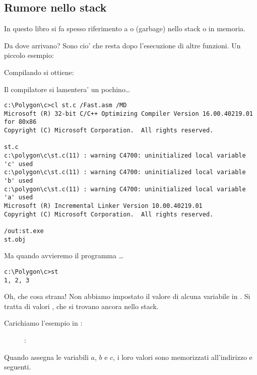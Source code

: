 \subsection{Rumore nello stack}

In questo libro si fa spesso riferimento a  o  (garbage) nello stack o in memoria.

Da dove arrivano?
Sono cio' che resta dopo l'esecuzione di altre funzioni.
Un piccolo esempio:



Compilando si ottiene:



Il compilatore si lamentera' un pochino\dots

\begin{lstlisting}
c:\Polygon\c>cl st.c /Fast.asm /MD
Microsoft (R) 32-bit C/C++ Optimizing Compiler Version 16.00.40219.01 for 80x86
Copyright (C) Microsoft Corporation.  All rights reserved.

st.c
c:\polygon\c\st.c(11) : warning C4700: uninitialized local variable 'c' used
c:\polygon\c\st.c(11) : warning C4700: uninitialized local variable 'b' used
c:\polygon\c\st.c(11) : warning C4700: uninitialized local variable 'a' used
Microsoft (R) Incremental Linker Version 10.00.40219.01
Copyright (C) Microsoft Corporation.  All rights reserved.

/out:st.exe
st.obj
\end{lstlisting}

Ma quando avvieremo il programma \dots

\begin{lstlisting}
c:\Polygon\c>st
1, 2, 3
\end{lstlisting}

Oh, che cosa strana! Non abbiamo impostato il valore di alcuna variabile in . 
Si tratta di valori  , che si trovano ancora nello stack.

\clearpage
Carichiamo l'esempio in \olly:

\begin{figure}[H]
\centering
{}
\caption{\olly: }
\label{fig:stack_noise_olly1}
\end{figure}

Quando  assegna le variabili $a$, $b$ e $c$, i loro valori sono memorizzati all'indirizzo  e seguenti.

